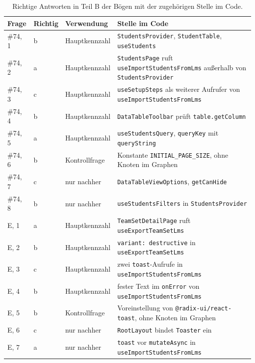\begin{table}[htbp]
  \centering
  \caption{Richtige Antworten in Teil B der Bögen mit der zugehörigen Stelle im Code.}
  \label{tab:schluessel-b}
  \small
  \begin{tabularx}{\textwidth}{lll>{\raggedright\arraybackslash}X}
    \toprule
    Frage & Richtig & Verwendung & Stelle im Code \\
    \midrule
    \#74, 1 & b & Hauptkennzahl & \texttt{StudentsProvider}, \texttt{StudentTable}, \texttt{useStudents} \\
    \#74, 2 & a & Hauptkennzahl & \texttt{StudentsPage} ruft \texttt{useImportStudentsFromLms} außerhalb von \texttt{StudentsProvider} \\
    \#74, 3 & c & Hauptkennzahl & \texttt{useSetupSteps} als weiterer Aufrufer von \texttt{useImportStudentsFromLms} \\
    \#74, 4 & b & Hauptkennzahl & \texttt{DataTableToolbar} prüft \texttt{table.getColumn} \\
    \#74, 5 & a & Hauptkennzahl & \texttt{useStudentsQuery}, \texttt{queryKey} mit \texttt{queryString} \\
    \#74, 6 & b & Kontrollfrage & Konstante \texttt{INITIAL\_PAGE\_SIZE}, ohne Knoten im Graphen \\
    \#74, 7 & c & nur nachher & \texttt{DataTableViewOptions}, \texttt{getCanHide} \\
    \#74, 8 & b & nur nachher & \texttt{useStudentsFilters} in \texttt{StudentsProvider} \\
    \midrule
    E, 1 & a & Hauptkennzahl & \texttt{TeamSetDetailPage} ruft \texttt{useExportTeamSetLms} \\
    E, 2 & b & Hauptkennzahl & \texttt{variant: \textquotedbl{}destructive\textquotedbl{}} in \texttt{useExportTeamSetLms} \\
    E, 3 & c & Hauptkennzahl & zwei \texttt{toast}-Aufrufe in \texttt{useImportStudentsFromLms} \\
    E, 4 & b & Hauptkennzahl & fester Text im \texttt{onError} von \texttt{useImportStudentsFromLms} \\
    E, 5 & b & Kontrollfrage & Voreinstellung von \texttt{@radix-ui/react-toast}, ohne Knoten im Graphen \\
    E, 6 & c & nur nachher & \texttt{RootLayout} bindet \texttt{Toaster} ein \\
    E, 7 & a & nur nachher & \texttt{toast} vor \texttt{mutateAsync} in \texttt{useImportStudentsFromLms} \\
    \bottomrule
  \end{tabularx}
\end{table}

